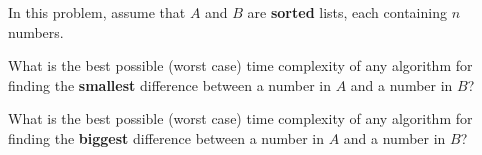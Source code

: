 \Needspace{2in}
\begin{prob}
    In this problem, assume that $A$ and $B$ are \textbf{sorted} lists,
    each containing $n$ numbers.

    \begin{subprobset}

        \begin{subprob}
            What is the best possible (worst case) time complexity of any
            algorithm for finding the \textbf{smallest} difference between a number in
            $A$ and a number in $B$?

        \end{subprob}

        \begin{subprob}
            What is the best possible (worst case) time complexity of any
            algorithm for finding the \textbf{biggest} difference between a number in
            $A$ and a number in $B$?
        \end{subprob}


    \end{subprobset}

\end{prob}
